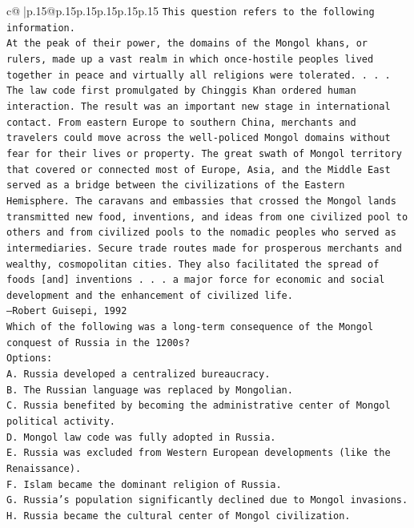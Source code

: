 \documentclass{article}
\begin{document}
{\begin{supertabular}{c@{$\;$}|p{.15\linewidth}@{}p{.15\linewidth}p{.15\linewidth}p{.15\linewidth}p{.15\linewidth}p{.15\linewidth}}
{{{\texttt{This question refers to the following information.} \\
\texttt{At the peak of their power, the domains of the Mongol khans, or rulers, made up a vast realm in which once{-}hostile peoples lived together in peace and virtually all religions were tolerated. . . . The law code first promulgated by Chinggis Khan ordered human interaction. The result was an important new stage in international contact. From eastern Europe to southern China, merchants and travelers could move across the well{-}policed Mongol domains without fear for their lives or property. The great swath of Mongol territory that covered or connected most of Europe, Asia, and the Middle East served as a bridge between the civilizations of the Eastern Hemisphere. The caravans and embassies that crossed the Mongol lands transmitted new food, inventions, and ideas from one civilized pool to others and from civilized pools to the nomadic peoples who served as intermediaries. Secure trade routes made for prosperous merchants and wealthy, cosmopolitan cities. They also facilitated the spread of foods {[}and{]} inventions . . . a major force for economic and social development and the enhancement of civilized life.} \\
\texttt{—Robert Guisepi, 1992} \\
\texttt{Which of the following was a long{-}term consequence of the Mongol conquest of Russia in the 1200s?} \\
\texttt{Options:} \\
\texttt{A. Russia developed a centralized bureaucracy.} \\
\texttt{B. The Russian language was replaced by Mongolian.} \\
\texttt{C. Russia benefited by becoming the administrative center of Mongol political activity.} \\
\texttt{D. Mongol law code was fully adopted in Russia.} \\
\texttt{E. Russia was excluded from Western European developments (like the Renaissance).} \\
\texttt{F. Islam became the dominant religion of Russia.} \\
\texttt{G. Russia's population significantly declined due to Mongol invasions.} \\
\texttt{H. Russia became the cultural center of Mongol civilization.} \\
            }
        }
    }
     \\ \\


\end{supertabular}}
\end{document}
